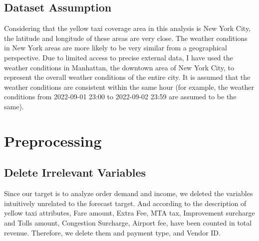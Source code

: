 \documentclass[11pt]{article}
\begin{document}
\subsection{Dataset Assumption}


Considering that the yellow taxi coverage area in this analysis is New York City, the latitude and longitude of these areas are very close. The weather conditions in New York areas are more likely to be very similar from a geographical perspective. Due to limited access to precise external data, I have used the weather conditions in Manhattan, the downtown area of New York City, to represent the overall weather conditions of the entire city. It is assumed that the weather conditions are consistent within the same hour (for example, the weather conditions from 2022-09-01 23:00 to 2022-09-02 23:59 are assumed to be the same).


\section{Preprocessing}

\subsection{Delete Irrelevant Variables}
Since our target is to analyze order demand and income, we deleted the variables intuitively unrelated to the forecast target. And according to the description of yellow taxi attributes, Fare amount, Extra Fee, MTA tax, Improvement surcharge and Tolls amount, Congestion Surcharge, Airport fee, have been counted in total revenue. Therefore, we delete them and payment type, and Vendor ID.
\end{document}
